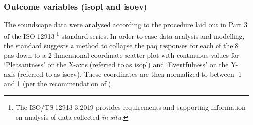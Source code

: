 
\subsubsection*{Outcome variables (\gls{isopl} and \gls{isoev})}
\label{sec:whoOutcomeVar}
The soundscape data were analysed according to the procedure laid out in Part 3 of the ISO 12913 \footnote{The ISO/TS 12913-3:2019 provides requirements and supporting information on analysis of data collected \emph{in-situ}.} standard series. In order to ease data analysis and modelling, the standard suggests a method to collapse the \gls{paq} responses for each of the 8 \glspl{pa} down to a 2-dimensional coordinate scatter plot with continuous values for `Pleasantness' on the X-axis (referred to as \gls{isopl}) and `Eventfulness' on the Y-axis (referred to as \gls{isoev}). These coordinates are then normalized to between -1 and 1 (per the recommendation of \citet{ISO12913Part3}).




